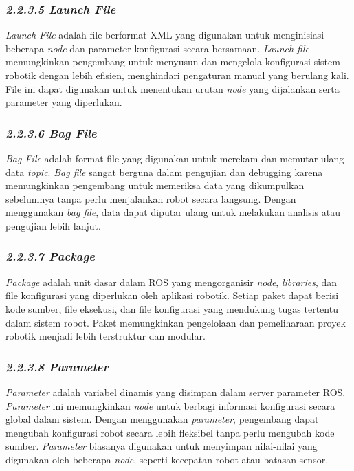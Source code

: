\subsubsection{\emph{2.2.3.5 Launch File}}
\emph{Launch File} adalah file berformat XML yang digunakan untuk menginisiasi beberapa \emph{node} dan parameter konfigurasi secara bersamaan. \emph{Launch file} memungkinkan pengembang untuk menyusun dan mengelola konfigurasi sistem robotik dengan lebih efisien, menghindari pengaturan manual yang berulang kali. File ini dapat digunakan untuk menentukan urutan \emph{node} yang dijalankan serta parameter yang diperlukan.

\subsubsection{\emph{2.2.3.6 Bag File}}
\emph{Bag File} adalah format file yang digunakan untuk merekam dan memutar ulang data \emph{topic}. \emph{Bag file} sangat berguna dalam pengujian dan debugging karena memungkinkan pengembang untuk memeriksa data yang dikumpulkan sebelumnya tanpa perlu menjalankan robot secara langsung. Dengan menggunakan \emph{bag file}, data dapat diputar ulang untuk melakukan analisis atau pengujian lebih lanjut.

\subsubsection{\emph{2.2.3.7 Package}}
\emph{Package} adalah unit dasar dalam ROS yang mengorganisir \emph{node}, \emph{libraries}, dan file konfigurasi yang diperlukan oleh aplikasi robotik. Setiap paket dapat berisi kode sumber, file eksekusi, dan file konfigurasi yang mendukung tugas tertentu dalam sistem robot. Paket memungkinkan pengelolaan dan pemeliharaan proyek robotik menjadi lebih terstruktur dan modular.

\subsubsection{\emph{2.2.3.8 Parameter}}
\emph{Parameter} adalah variabel dinamis yang disimpan dalam server parameter ROS. \emph{Parameter} ini memungkinkan \emph{node} untuk berbagi informasi konfigurasi secara global dalam sistem. Dengan menggunakan \emph{parameter}, pengembang dapat mengubah konfigurasi robot secara lebih fleksibel tanpa perlu mengubah kode sumber. \emph{Parameter} biasanya digunakan untuk menyimpan nilai-nilai yang digunakan oleh beberapa \emph{node}, seperti kecepatan robot atau batasan sensor.

